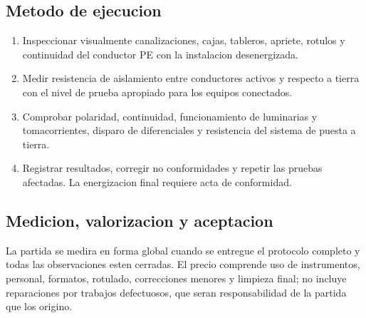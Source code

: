 \subsection{Metodo de ejecucion}
\begin{enumerate}
  \item Inspeccionar visualmente canalizaciones, cajas, tableros, apriete, rotulos y
  continuidad del conductor PE con la instalacion desenergizada.
  \item Medir resistencia de aislamiento entre conductores activos y respecto a tierra
  con el nivel de prueba apropiado para los equipos conectados.
  \item Comprobar polaridad, continuidad, funcionamiento de luminarias y
  tomacorrientes, disparo de diferenciales y resistencia del sistema de puesta a
  tierra.
  \item Registrar resultados, corregir no conformidades y repetir las pruebas
  afectadas. La energizacion final requiere acta de conformidad.
\end{enumerate}

\subsection{Medicion, valorizacion y aceptacion}
La partida se medira en forma global cuando se entregue el protocolo completo y todas
las observaciones esten cerradas. El precio comprende uso de instrumentos, personal,
formatos, rotulado, correcciones menores y limpieza final; no incluye reparaciones por
trabajos defectuosos, que seran responsabilidad de la partida que los origino.
